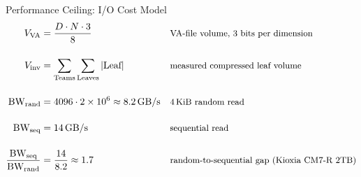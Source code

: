 \begin{frame}[noframenumbering]{Performance Ceiling: I/O Cost Model}
  \begin{align*}
    V_{\text{VA}} &= \frac{D \cdot N \cdot 3}{8}
      && \text{\small VA-file volume, 3 bits per dimension}\\[1.2em]
    V_{\text{inv}} &= \sum_{\text{Teams}}\sum_{\text{Leaves}} |\text{Leaf}|
      && \text{\small measured compressed leaf volume}\\[1.2em]
    \text{BW}_{\text{rand}} &= 4096 \cdot 2 \times 10^{6}
                             \approx 8.2\,\text{GB/s}
      && \text{\small 4\,KiB random read}\\[1.2em]
    \text{BW}_{\text{seq}} &= 14\,\text{GB/s}
      && \text{\small sequential read}\\[1.2em]
    \frac{\text{BW}_{\text{seq}}}{\text{BW}_{\text{rand}}}
      &= \frac{14}{8.2} \approx 1.7
      && \text{\small random-to-sequential gap (Kioxia CM7-R 2TB)}\\[1.2em]
  \end{align*}
\end{frame}
